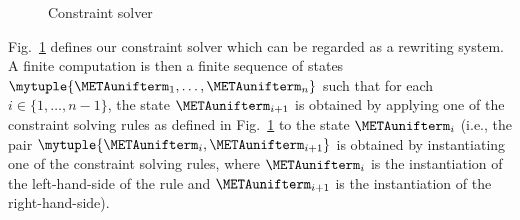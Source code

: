 \documentclass{jfp1}
\newcommand{\myfigure}{figure}
\begin{document}

\begin{\myfigure}[!t]
  
  \caption{Constraint solver}
  \label{fig:unifAlgoOpen}
\end{\myfigure}
%
Fig.~\ref{fig:unifAlgoOpen} defines
%
%
%
our constraint solver
%
which can be regarded as a rewriting system.
%
A finite computation is then a finite sequence of states
$\mytuple{\METAunifterm_1,\dots,\METAunifterm_n}$ such that for each
$i\in\{1,\dots,n-1\}$, the state $\METAunifterm_{i+1}$ is obtained by
applying one of the constraint solving rules as defined in
Fig.~\ref{fig:unifAlgoOpen} to the state $\METAunifterm_i$ (i.e., the
pair $\mytuple{\METAunifterm_i,\METAunifterm_{i+1}}$ is obtained by
instantiating one of the constraint solving rules, where
$\METAunifterm_i$ is the instantiation of the left-hand-side of the
rule and $\METAunifterm_{i+1}$ is the instantiation of the
right-hand-side).
\end{document}
